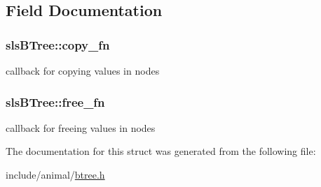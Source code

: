 \subsection{Field Documentation}
\hypertarget{structsls_b_tree_a6fc84cddafbd7b9d9ac73471b2174833}{
\subsubsection[{copy\+\_\+fn}]{ sls\+B\+Tree\+::copy\+\_\+fn}}\label{structsls_b_tree_a6fc84cddafbd7b9d9ac73471b2174833}
callback for copying values in nodes \hypertarget{structsls_b_tree_a184ef530c5a5ae70db3d96c236ef4030}{
\subsubsection[{free\+\_\+fn}]{ sls\+B\+Tree\+::free\+\_\+fn}}\label{structsls_b_tree_a184ef530c5a5ae70db3d96c236ef4030}
callback for freeing values in nodes 

The documentation for this struct was generated from the following file\+:\begin{DoxyCompactItemize}
\item 
include/animal/\hyperlink{btree_8h}{btree.\+h}\end{DoxyCompactItemize}
